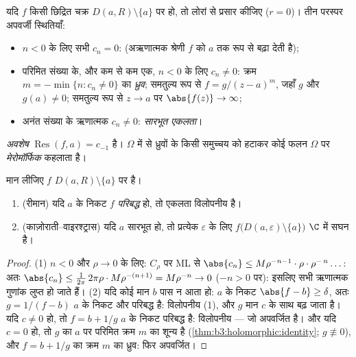 \begin{definition}\label{def:b3:residues:singularities}
यदि $f$ किसी छिद्रित चक्र $D(a, R)\setminus
\{a\}$ पर  हो, तो लोरां से
प्रसार कीजिए ($r = 0$)। तीन परस्पर अपवर्जी स्थितियाँ:
\begin{itemize}
  \item $n < 0$ के लिए सभी $c_n = 0$: \emph{} (अऋणात्मक
        श्रेणी $f$ को $a$ तक  रूप से बढ़ा देती है);
  \item परिमित संख्या के, और कम से कम एक, $n < 0$ के लिए $c_n \neq 0$:
        क्रम $m = -\min\{n : c_n \neq 0\}$ का \emph{ध्रुव}; समतुल्य रूप से $f = g/(z-a)^m$, जहाँ
        $g$  और $g(a)
        \neq 0$; समतुल्य रूप से $z\to
        a$ पर
        $\abs{f(z)} \to \infty$;
  \item अनंत संख्या के ऋणात्मक $c_n \neq 0$: \emph{सारभूत एकलता}।
\end{itemize}
\emph{अवशेष} $\operatorname{Res}(f, a) = c_{-1}$ है। $\Omega$ में से ध्रुवों के किसी
समुच्चय को हटाकर  कोई फलन $\Omega$ पर
\emph{मेरोमॉर्फिक} कहलाता है।
\end{definition}

\begin{theorem}[रीमान; काज़ोराती--वाइरश्ट्रास]
\label{thm:b3:residues:riemanncw}
मान लीजिए $f$ $D(a,R)\setminus\{a\}$ पर  है।
\begin{enumerate}
  \item (रीमान) यदि $a$ के निकट $f$ \emph{परिबद्ध} हो, तो
        एकलता विलोपनीय है।
  \item (काज़ोराती--वाइरश्ट्रास) यदि $a$ सारभूत हो, तो प्रत्येक
        $\varepsilon$ के लिए $f\bigl(D(a,\varepsilon)\setminus\{a\}\bigr)$ $\C$ में सघन
        है।
\end{enumerate}
\end{theorem}

\begin{proof}
(1) $n < 0$ और $\rho \to 0$ के लिए: $C_\rho$ पर ML से $\abs{c_n} \leq
M\rho^{-n-1}\cdot\rho\cdot\rho^{-\,n}\dots$: अतः $\abs{c_n} \leq \frac{1}{2\pi}\,2\pi\rho\cdot
M\rho^{-(n+1)} = M\rho^{-n} \to 0$
($-n > 0$ पर): इसलिए सभी ऋणात्मक गुणांक लुप्त हो जाते हैं।
(2) यदि कोई मान $b$ पास न आता हो: $a$ के निकट $\abs{f - b} \geq
\delta$, अतः
$g = 1/(f - b)$ $a$ के निकट  और परिबद्ध है: विलोपनीय (1), और
$g$ मान $c$ के साथ बढ़ जाता है। यदि $c \neq 0$ हो, तो $f = b + 1/g$ $a$
के निकट परिबद्ध है: विलोपनीय --- जो अपवर्जित है। और यदि $c = 0$ हो,
तो $g$ का $a$ पर परिमित क्रम $m$ का शून्य है (\cref{thm:b3:holomorphic:identity}; $g \not\equiv 0$),
और $f = b + 1/g$ का क्रम $m$ का ध्रुव: फिर अपवर्जित।
\end{proof}


